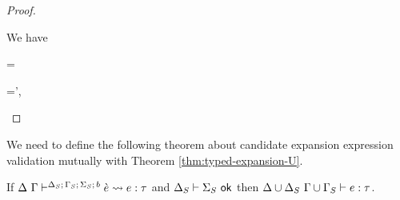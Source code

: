 \begin{proof}
\begin{byCases}
\item[\text{(\ref{rule:expandsU-tsmap})}] We have 
\begin{pfsteps}
  \item \ue= 
  \item \Sigma=\Sigma',  
  \item {} 
  \item {} 
  \item \decodeCondE{\ecand}{\ce} 
  \item {} 
  \item \uetsmenv{\Delta}{\Sigma}  
  \item {} 
\end{pfsteps}
\resetpfcounter
\end{byCases}
\end{proof}
We need to define the following theorem about candidate expansion expression validation mutually with Theorem \ref{thm:typed-expansion-U}. 
\begin{theorem}\label{thm:candidate-expansion-validation-U}
If $\Delta~\Gamma\vdash^{\Delta_S;\,\Gamma_S;\,\Sigma_S;\,b} \grave{e} \leadsto e : \tau$ and $\Delta_S \vdash \Sigma_S~\mathsf{ok}$ then ${\Delta}\cup{\Delta_S}~{\Gamma}\cup{\Gamma_S} \vdash e : \tau$.
\end{theorem}
